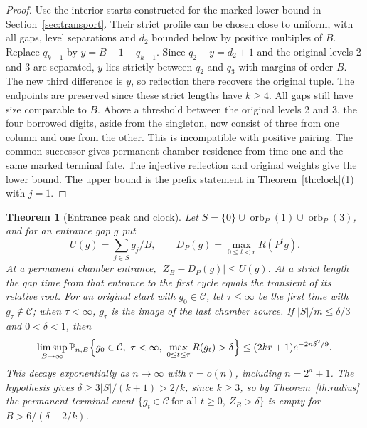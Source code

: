 \documentclass[11pt]{amsart}
\newtheorem{theorem}{Theorem}
\theoremstyle{definition}
\newcommand{\PP}{\mathbb P}
\newcommand{\C}{\mathcal C}
\begin{document}
\begin{proof}
Use the interior starts constructed for the marked lower
bound in Section~\ref{sec:transport}. Their strict profile
can be chosen close to uniform, with all gaps, level
separations and \(d_2\) bounded below by positive multiples
of \(B\). Replace \(q_{k-1}\) by \(y=B-1-q_{k-1}\).
Since \(q_2-y=d_2+1\) and the original levels 2 and 3
are separated, \(y\) lies strictly between \(q_2\) and \(q_3\)
with margins of order \(B\). The new third difference is
\(y\), so reflection there recovers the original tuple.
The endpoints are preserved since these strict lengths
have \(k\ge4\). All gaps still have size comparable to \(B\).
Above a threshold between the original levels 2 and 3,
the four borrowed digits, aside from the singleton, now
consist of three from one column and one from the other.
This is incompatible with positive pairing. The common
successor gives permanent chamber residence from time one
and the same marked terminal fate. The injective reflection
and original weights give the lower bound. The upper
bound is the prefix statement in Theorem~\ref{th:clock}(1)
with \(j=1\).
\end{proof}

\begin{theorem}[Entrance peak and clock]\label{th:entrance}
Let \(S=\{0\}\cup\operatorname{orb}_P(1)\cup\operatorname{orb}_P(3)\),
and for an entrance gap \(g\) put
\[
 U(g)=\sum_{j\in S}g_j/B,\qquad
 D_P(g)=\max_{0\le t<r} R(P^t g).
\]
At a permanent chamber entrance,
\(|Z_B-D_P(g)|\le U(g)\).
At a strict length the gap time from that entrance to the
first cycle equals the transient of its relative root.
For an original start with \(g_0\in\C\), let \(\tau\le\infty\) be the
first time with \(g_\tau\notin\C\); when \(\tau<\infty\), \(g_\tau\) is
the image of the last chamber source. If \(|S|/m\le\delta/3\) and
\(0<\delta<1\), then
\[
 \limsup_{B\to\infty}
 \PP_{n,B}\Bigl\{g_0\in\C,\ \tau<\infty,\
 \max_{0\le t\le\tau}R(g_t)>\delta\Bigr\}
 \le (2kr+1)e^{-2n\delta^2/9}.
\]
This decays exponentially as \(n\to\infty\) with
\(r=o(n)\), including \(n=2^a\pm1\). The hypothesis gives
\(\delta\ge3|S|/(k+1)>2/k\), since \(k\ge3\), so by
Theorem~\ref{th:radius} the permanent terminal event
\(\{g_t\in\C\ \text{for all }t\ge0,\ Z_B>\delta\}\) is empty for
\(B>6/(\delta-2/k)\).
\end{theorem}
\end{document}
